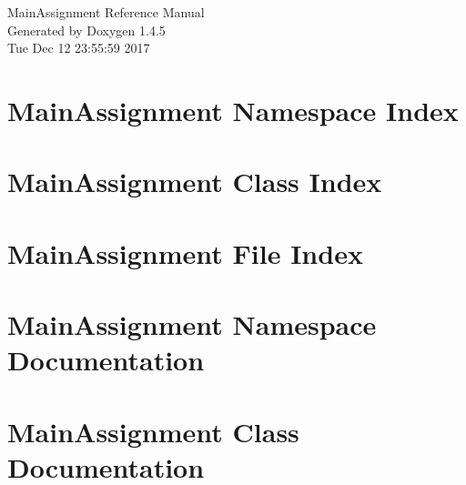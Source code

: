\documentclass[a4paper]{book}
\begin{document}
\begin{titlepage}
\vspace*{7cm}
\begin{center}
{\Large Main\-Assignment Reference Manual}\\
\vspace*{1cm}
{\large Generated by Doxygen 1.4.5}\\
\vspace*{0.5cm}
{\small Tue Dec 12 23:55:59 2017}\\
\end{center}
\end{titlepage}
\clearemptydoublepage
{}
\tableofcontents
\clearemptydoublepage
{}
\chapter{Main\-Assignment Namespace Index}

\chapter{Main\-Assignment Class Index}

\chapter{Main\-Assignment File Index}

\chapter{Main\-Assignment Namespace Documentation}

\chapter{Main\-Assignment Class Documentation}





















\end{document}
